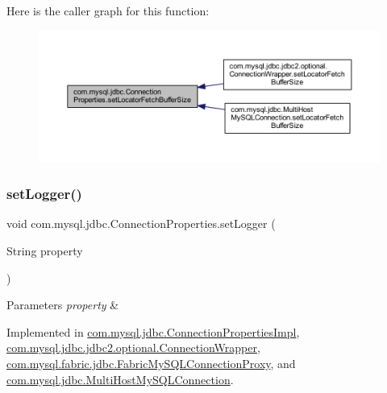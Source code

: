 Here is the caller graph for this function\+:\nopagebreak
\begin{figure}[H]
\begin{center}
\leavevmode
\includegraphics[width=350pt]{interfacecom_1_1mysql_1_1jdbc_1_1_connection_properties_ae7d48146159a39b7171b4b5a074466c1_icgraph}
\end{center}
\end{figure}
\mbox{\label{interfacecom_1_1mysql_1_1jdbc_1_1_connection_properties_a9ad6baf8983bc1bf352b58b0e1634be1}} 
\subsubsection{\texorpdfstring{set\+Logger()}{setLogger()}}
{\footnotesize\ttfamily void com.\+mysql.\+jdbc.\+Connection\+Properties.\+set\+Logger (\begin{DoxyParamCaption}\item[{String}]{property }\end{DoxyParamCaption})}


\begin{DoxyParams}{Parameters}
{\em property} & \\
\hline
\end{DoxyParams}


Implemented in \mbox{\hyperlink{classcom_1_1mysql_1_1jdbc_1_1_connection_properties_impl_aba563c4b80406355d1d10ac2f9f109f9}{com.\+mysql.\+jdbc.\+Connection\+Properties\+Impl}}, \mbox{\hyperlink{classcom_1_1mysql_1_1jdbc_1_1jdbc2_1_1optional_1_1_connection_wrapper_ab982b5f1ecb96624a273f3a120971b09}{com.\+mysql.\+jdbc.\+jdbc2.\+optional.\+Connection\+Wrapper}}, \mbox{\hyperlink{classcom_1_1mysql_1_1fabric_1_1jdbc_1_1_fabric_my_s_q_l_connection_proxy_acbb234af5c1b9c62444c4886f811a3dd}{com.\+mysql.\+fabric.\+jdbc.\+Fabric\+My\+S\+Q\+L\+Connection\+Proxy}}, and \mbox{\hyperlink{classcom_1_1mysql_1_1jdbc_1_1_multi_host_my_s_q_l_connection_a8ff36862180722f5f43542808c8764f0}{com.\+mysql.\+jdbc.\+Multi\+Host\+My\+S\+Q\+L\+Connection}}.


